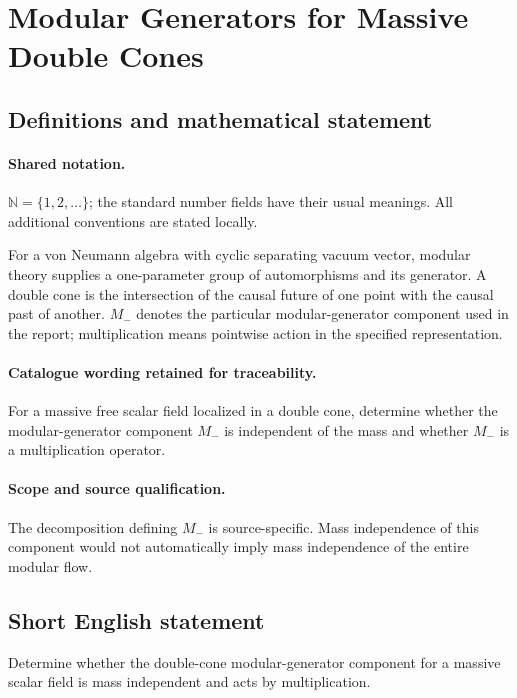 \documentclass[11pt]{article}
\begin{document}
\section{Modular Generators for Massive Double Cones}\label{statement}

\subsection{Definitions and mathematical statement}

\paragraph{Shared notation.}$\mathbb N=\{1,2,\ldots\}$; the standard number fields have their usual meanings. All additional conventions are stated locally.


For a von Neumann algebra with cyclic separating vacuum vector, modular theory supplies a one-parameter group of automorphisms and its generator. A double cone is the intersection of the causal future of one point with the causal past of another. $M_-$ denotes the particular modular-generator component used in the report; multiplication means pointwise action in the specified representation.

\paragraph{Catalogue wording retained for traceability.}
For a massive free scalar field localized in a double cone, determine whether the modular-generator component $M_-$ is independent of the mass and whether $M_-$ is a multiplication operator.

\paragraph{Scope and source qualification.}The decomposition defining $M_-$ is source-specific. Mass independence of this component would not automatically imply mass independence of the entire modular flow.
\subsection{Short English statement}
Determine whether the double-cone modular-generator component for a massive scalar field is mass independent and acts by multiplication.
\end{document}
